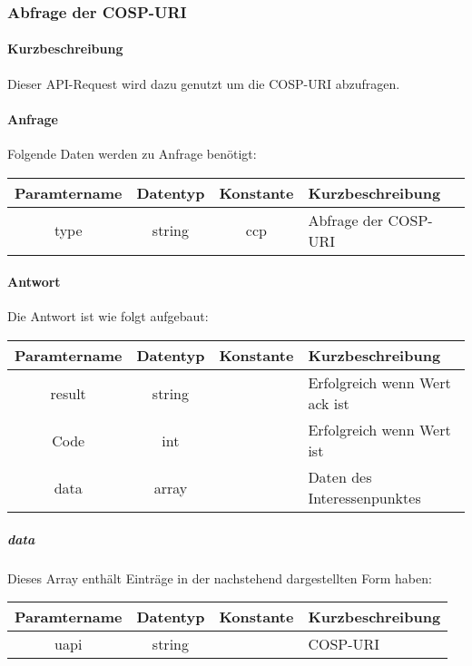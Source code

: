 \subsubsection{Abfrage der {\glqq COSP\grqq}-URI}
\paragraph{Kurzbeschreibung}Dieser API-Request wird dazu genutzt um die {\glqq COSP\grqq}-URI abzufragen.
\paragraph{Anfrage}Folgende Daten werden zu Anfrage benötigt:
\begin{table}[H]
	\begin{tabular}{|c|c|c|p{6.5cm}|}
		\hline
		\textbf{Paramtername} & \textbf{Datentyp} & \textbf{Konstante} & \textbf{Kurzbeschreibung}                                                                                               \\ \hline
		type                & string            & ccp                & Abfrage der {\glqq COSP\grqq}-URI \\ \hline
	\end{tabular}
\end{table}
\paragraph{Antwort}Die Antwort ist wie folgt aufgebaut:
\begin{table}[H]
	\begin{tabular}{|c|c|c|p{6.5cm}|}
		\hline
		\textbf{Paramtername} & \textbf{Datentyp} & \textbf{Konstante} & \textbf{Kurzbeschreibung}                                                                                               \\ \hline
		result              & string           &                 & Erfolgreich wenn Wert {\glqq ack\grqq} ist \\ \hline
		Code                & int              &                 & Erfolgreich wenn Wert {\glqq 0\grqq} ist \\ \hline
		data                & array            &                 & Daten des Interessenpunktes \\ \hline
	\end{tabular}
\end{table}
\subparagraph{data}Dieses Array enthält Einträge in der nachstehend dargestellten Form haben:
\begin{table}[H]
	\begin{tabular}{|c|c|c|p{6.5cm}|}
		\hline
		\textbf{Paramtername} & \textbf{Datentyp} & \textbf{Konstante} & \textbf{Kurzbeschreibung}    \\ \hline
		uapi               & string            &                 & {\glqq COSP\grqq}-URI \\ \hline
	\end{tabular}
\end{table}
